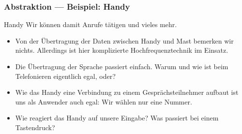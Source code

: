 \begin{frame}
	\frametitle{Abstraktion --- Beispiel: Handy}

	\begin{exampleblock}{Handy}
		Wir können damit Anrufe tätigen und vieles mehr.
		\begin{itemize}
			\item Von der Übertragung der Daten zwischen Handy und Mast
				bemerken wir nichts. Allerdings ist hier komplizierte
                                Hochfrequenztechnik im Einsatz.
			\item Die Übertragung der Sprache passiert einfach. Warum und wie
				ist beim Telefonieren eigentlich egal, oder?
			\item Wie das Handy eine Verbindung zu einem
				Gesprächsteilnehmer aufbaut ist uns als Anwender auch egal:
                                Wir wählen nur eine Nummer.
			\item Wie reagiert das Handy auf unsere Eingabe? Was
				passiert bei einem Tastendruck?
		\end{itemize}
	\end{exampleblock}

\end{frame}

